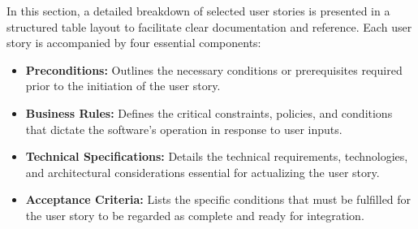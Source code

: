 In this section, a detailed breakdown of selected user stories is presented in a structured table layout to facilitate clear documentation and reference. Each user story is accompanied by four essential components:
\begin{itemize}
    \item \textbf{Preconditions:} Outlines the necessary conditions or prerequisites required prior to the initiation of the user story.
    \item \textbf{Business Rules:} Defines the critical constraints, policies, and conditions that dictate the software's operation in response to user inputs.
    \item \textbf{Technical Specifications:} Details the technical requirements, technologies, and architectural considerations essential for actualizing the user story.
    \item \textbf{Acceptance Criteria:} Lists the specific conditions that must be fulfilled for the user story to be regarded as complete and ready for integration.
\end{itemize}


